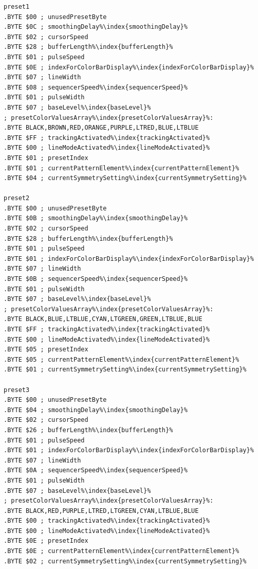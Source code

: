 \begin{minipage}[b]{0.33\linewidth}
\begin{lrbox}{\mybox}%
\begin{lstlisting}[basicstyle=\ttfamily\tiny,escapechar=\%]
preset1
.BYTE $00 ; unusedPresetByte
.BYTE $0C ; smoothingDelay%\index{smoothingDelay}%
.BYTE $02 ; cursorSpeed
.BYTE $28 ; bufferLength%\index{bufferLength}%
.BYTE $01 ; pulseSpeed
.BYTE $0E ; indexForColorBarDisplay%\index{indexForColorBarDisplay}%
.BYTE $07 ; lineWidth
.BYTE $08 ; sequencerSpeed%\index{sequencerSpeed}%
.BYTE $01 ; pulseWidth
.BYTE $07 ; baseLevel%\index{baseLevel}%
; presetColorValuesArray%\index{presetColorValuesArray}%: 
.BYTE BLACK,BROWN,RED,ORANGE,PURPLE,LTRED,BLUE,LTBLUE
.BYTE $FF ; trackingActivated%\index{trackingActivated}%
.BYTE $00 ; lineModeActivated%\index{lineModeActivated}%
.BYTE $01 ; presetIndex
.BYTE $01 ; currentPatternElement%\index{currentPatternElement}%
.BYTE $04 ; currentSymmetrySetting%\index{currentSymmetrySetting}%

preset2
.BYTE $00 ; unusedPresetByte
.BYTE $0B ; smoothingDelay%\index{smoothingDelay}%
.BYTE $02 ; cursorSpeed
.BYTE $28 ; bufferLength%\index{bufferLength}%
.BYTE $01 ; pulseSpeed
.BYTE $01 ; indexForColorBarDisplay%\index{indexForColorBarDisplay}%
.BYTE $07 ; lineWidth
.BYTE $0B ; sequencerSpeed%\index{sequencerSpeed}%
.BYTE $01 ; pulseWidth
.BYTE $07 ; baseLevel%\index{baseLevel}%
; presetColorValuesArray%\index{presetColorValuesArray}%: 
.BYTE BLACK,BLUE,LTBLUE,CYAN,LTGREEN,GREEN,LTBLUE,BLUE
.BYTE $FF ; trackingActivated%\index{trackingActivated}%
.BYTE $00 ; lineModeActivated%\index{lineModeActivated}%
.BYTE $05 ; presetIndex
.BYTE $05 ; currentPatternElement%\index{currentPatternElement}%
.BYTE $01 ; currentSymmetrySetting%\index{currentSymmetrySetting}%

preset3
.BYTE $00 ; unusedPresetByte
.BYTE $04 ; smoothingDelay%\index{smoothingDelay}%
.BYTE $02 ; cursorSpeed
.BYTE $26 ; bufferLength%\index{bufferLength}%
.BYTE $01 ; pulseSpeed
.BYTE $01 ; indexForColorBarDisplay%\index{indexForColorBarDisplay}%
.BYTE $07 ; lineWidth
.BYTE $0A ; sequencerSpeed%\index{sequencerSpeed}%
.BYTE $01 ; pulseWidth
.BYTE $07 ; baseLevel%\index{baseLevel}%
; presetColorValuesArray%\index{presetColorValuesArray}%: 
.BYTE BLACK,RED,PURPLE,LTRED,LTGREEN,CYAN,LTBLUE,BLUE
.BYTE $00 ; trackingActivated%\index{trackingActivated}%
.BYTE $00 ; lineModeActivated%\index{lineModeActivated}%
.BYTE $0E ; presetIndex
.BYTE $0E ; currentPatternElement%\index{currentPatternElement}%
.BYTE $02 ; currentSymmetrySetting%\index{currentSymmetrySetting}%


\end{lstlisting}
\end{lrbox}
\end{minipage}
